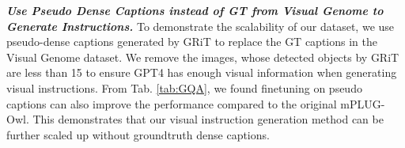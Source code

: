 \textbf{\textit{Use Pseudo Dense Captions instead of GT from Visual Genome to Generate Instructions.}} To demonstrate the scalability of our dataset, we use pseudo-dense captions generated by GRiT \citep{wu2022grit} to replace the GT captions in the Visual Genome dataset. We remove the images, whose detected objects by GRiT are less than 15 to ensure GPT4 has enough visual information when generating visual instructions. From Tab. \ref{tab:GQA}, we found finetuning on pseudo captions can also improve the performance compared to the original mPLUG-Owl. This demonstrates that our visual instruction generation method can be further scaled up without groundtruth dense captions.



